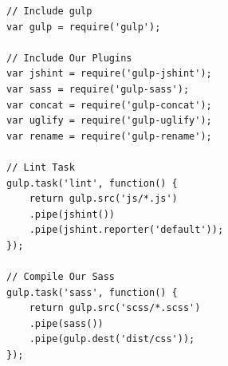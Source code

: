 \begin{lstlisting}[label=lst:sample-gulp,caption=sample gulp]
// Include gulp
var gulp = require('gulp');

// Include Our Plugins
var jshint = require('gulp-jshint');
var sass = require('gulp-sass');
var concat = require('gulp-concat');
var uglify = require('gulp-uglify');
var rename = require('gulp-rename');

// Lint Task
gulp.task('lint', function() {
	return gulp.src('js/*.js')
	.pipe(jshint())
	.pipe(jshint.reporter('default'));
});

// Compile Our Sass
gulp.task('sass', function() {
	return gulp.src('scss/*.scss')
	.pipe(sass())
	.pipe(gulp.dest('dist/css'));
});
\end{lstlisting}
